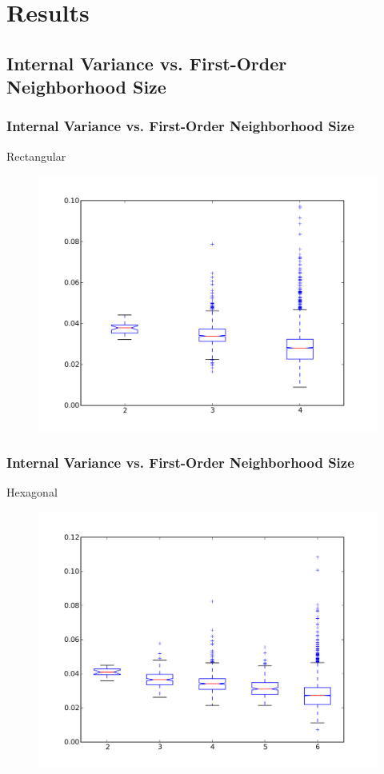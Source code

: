 \documentclass[nototal,handout]{beamer}
\begin{document}
\section{Results} 

\subsection{Internal Variance vs. First-Order Neighborhood Size} 

\begin{frame}
	\frametitle{Internal Variance vs. First-Order Neighborhood Size}
 
\begin{block}{Rectangular}
  \begin{center}
  \begin{figure}
  \includegraphics[width=0.75\linewidth]{rook_iv_box.png}
  \end{figure}
  \end{center}
 \end{block} \end{frame} 

\begin{frame}
	\frametitle{Internal Variance vs. First-Order Neighborhood Size}
 
\begin{block}{Hexagonal}
  \begin{center}
  \begin{figure}
  \includegraphics[width=0.75\linewidth]{hex_iv_box.png}
  \end{figure}
  \end{center}
 \end{block} \end{frame} 
\end{document}
